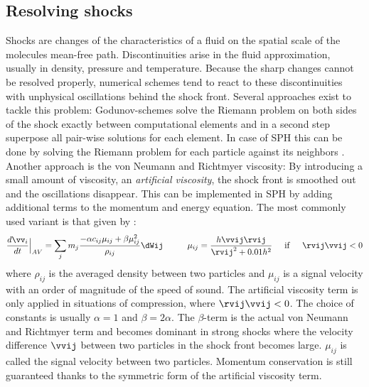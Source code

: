 \subsection{Resolving shocks}
Shocks are changes of the characteristics of a fluid on the spatial scale of the molecules mean-free path. Discontinuities arise in the fluid approximation, usually in density, pressure and temperature. Because the sharp changes cannot be resolved properly, numerical schemes tend to react to these discontinuities with unphysical oscillations behind the shock front.
Several approaches exist to tackle this problem: Godunov-schemes solve the Riemann problem on both sides of the shock exactly between computational elements and in a second step superpose all pair-wise solutions for each element. In case of SPH this can be done by solving the Riemann problem for each particle against its neighbors \citep{Monaghan:1997p3938}.
Another approach is the von Neumann and Richtmyer viscosity: By introducing a small amount of viscosity, an \emph{artificial viscosity}, the shock front is smoothed out and the oscillations disappear. This can be implemented in SPH by adding additional terms to the momentum and energy equation. The most commonly used variant is that given by \cite{Monaghan:1992ARAA..30..543M}:
\begin{equation}
\label{ch02_sph02_eq016}
\frac{d \vv_i }{dt} \Big|_{AV} = \sum_{j} m_j \frac{-\alpha c_{ij} \mu_{ij} + \beta \mu_{ij}^2}{\rho_{ij}} \dWij \hspace{1.0cm} \mu_{ij} = \frac{h \vvij \rvij}{\rvij^2 + 0.01h^2}  \hspace{0.5cm} \mathrm{if}  \hspace{0.5cm} \rvij \vvij < 0
\end{equation}
where $\rho_{ij}$ is the averaged density between two particles and $\mu_{ij}$ is a signal velocity with an order of magnitude of the speed of sound. The artificial viscosity term is only applied in situations of compression, where $\rvij \vvij < 0$. The choice of constants is usually $\alpha = 1$ and $\beta = 2 \alpha$. The $\beta$-term is the actual von Neumann and Richtmyer term and becomes dominant in strong shocks where the velocity difference $\vvij$ between two particles in the shock front becomes large. $\mu_{ij}$ is called the signal velocity between two particles. Momentum conservation is still guaranteed thanks to the symmetric form of the artificial viscosity term.

